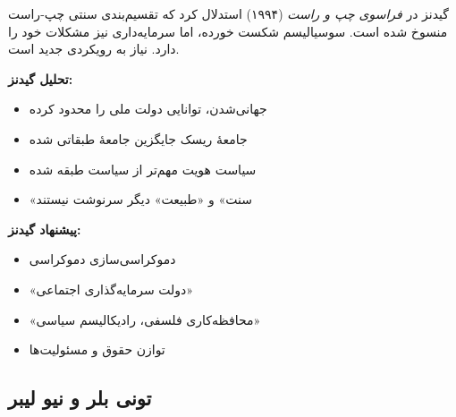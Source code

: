 گیدنز در \textit{فراسوی چپ و راست} (۱۹۹۴) استدلال کرد که تقسیم‌بندی سنتی چپ-راست منسوخ شده است. سوسیالیسم شکست خورده، اما سرمایه‌داری نیز مشکلات خود را دارد. نیاز به رویکردی جدید است.

\textbf{تحلیل گیدنز:}
\begin{itemize}
    \item جهانی‌شدن، توانایی دولت ملی را محدود کرده
    \item جامعهٔ ریسک جایگزین جامعهٔ طبقاتی شده
    \item سیاست هویت مهم‌تر از سیاست طبقه شده
    \item «سنت» و «طبیعت» دیگر سرنوشت نیستند
\end{itemize}

\textbf{پیشنهاد گیدنز:}
\begin{itemize}
    \item دموکراسی‌سازی دموکراسی
    \item «دولت سرمایه‌گذاری اجتماعی»
    \item «محافظه‌کاری فلسفی، رادیکالیسم سیاسی»
    \item توازن حقوق و مسئولیت‌ها
\end{itemize}


\subsection{تونی بلر و نیو لیبر}


